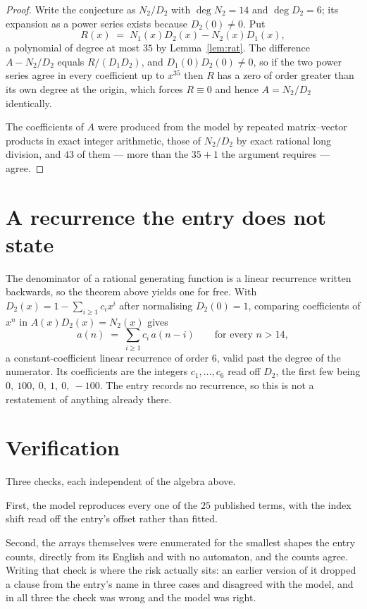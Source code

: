 \documentclass[11pt,a4paper]{article}
\theoremstyle{plain}
\theoremstyle{definition}
\begin{document}
\begin{proof}
Write the conjecture as $N_2/D_2$ with $\deg N_2=14$ and $\deg D_2=6$; its expansion as a
power series exists because $D_2(0)\neq0$. Put
\[
R(x)\;=\;N_1(x)D_2(x)-N_2(x)D_1(x),
\]
a polynomial of degree at most $35$ by Lemma~\ref{lem:rat}. The difference
$A-N_2/D_2$ equals $R/(D_1D_2)$, and $D_1(0)D_2(0)\neq0$, so if the two power series agree in
every coefficient up to $x^{35}$ then $R$ has a zero of order greater than its own
degree at the origin, which forces $R\equiv0$ and hence $A=N_2/D_2$ identically.

The coefficients of $A$ were produced from the model by repeated matrix--vector products in
exact integer arithmetic, those of $N_2/D_2$ by exact rational long division, and $43$
of them --- more than the $35+1$ the argument requires --- agree.
\end{proof}

\section{A recurrence the entry does not state}

The denominator of a rational generating function is a linear recurrence written backwards, so
the theorem above yields one for free. With $D_2(x)=1-\sum_{i\ge1}c_ix^i$ after normalising
$D_2(0)=1$, comparing coefficients of $x^n$ in $A(x)D_2(x)=N_2(x)$ gives
\[
a(n)\;=\;\sum_{i\ge1}c_i\,a(n-i)\qquad\text{for every }n>14,
\]
a constant-coefficient linear recurrence of order $6$, valid past the degree of the
numerator. Its coefficients are the integers $c_1,\dots,c_{6}$ read off $D_2$, the first few being $0,\ 100,\ 0,\ 1,\ 0,\ -100$. The entry records no recurrence, so this is not a restatement of anything
already there.

\section{Verification}

Three checks, each independent of the algebra above.

First, the model reproduces every one of the $25$ published terms, with the index shift
read off the entry's offset rather than fitted.

Second, the arrays themselves were enumerated for the smallest shapes the entry counts,
directly from its English and with no automaton, and the counts agree. Writing that check is
where the risk actually sits: an earlier version of it dropped a clause from the entry's name
in three cases and disagreed with the model, and in all three the check was wrong and the model
was right.
\end{document}
